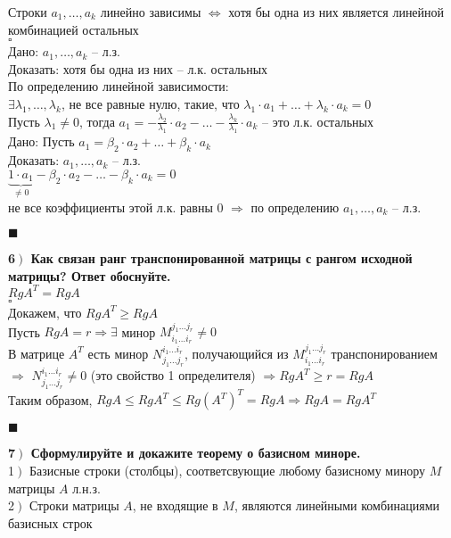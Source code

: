 \documentclass[a4paper,12pt]{article}
\begin{document}
Строки $a_1, \ldots, a_k$ линейно зависимы $\Leftrightarrow$ хотя бы одна из них является линейной комбинацией остальных\\
$\square$\\
Дано: $a_1, \ldots, a_k$ -- л.з.\\
Доказать: хотя бы одна из них -- л.к. остальных\\
По определению линейной зависимости:\\
$\exists \lambda_1, \ldots, \lambda_k$, не все равные нулю, такие, что $\lambda_1\cdot a_1+\ldots+\lambda_k\cdot a_k=0$\\
Пусть $\lambda_1\ne0$, тогда $a_1=-\frac{\lambda_2}{\lambda_1}\cdot a_2-\ldots-\frac{\lambda_k}{\lambda_1}\cdot a_k$ -- это л.к. остальных\\
Дано: Пусть $a_1=\beta_2\cdot a_2+\ldots+\beta_k\cdot a_k$\\
Доказать: $a_1, \ldots,  a_k$ -- л.з.\\
$\underbrace{1\cdot a_1}_{\ne0}-\beta_2\cdot a_2-\ldots-\beta_k\cdot a_k=0$\\
не все коэффициенты этой л.к. равны 0 $\Rightarrow$ по определению $a_1, \ldots, a_k$ -- л.з.
\begin{flushright}
	$\blacksquare$
\end{flushright}
\textbf{6$\left.\right)$ Как связан ранг транспонированной матрицы с рангом исходной матрицы? Ответ обоснуйте.}\\ $RgA^T=RgA$\\
$\square$\\
Докажем, что $RgA^T\geq RgA$\\
Пусть $RgA=r\Rightarrow\exists$ минор $M_{i_1\ldots i_r}^{j_1\ldots j_r}\ne 0$\\
В матрице $A^T$ есть минор $N_{j_1\ldots j_r}^{i_1\ldots i_r}$, получающийся из $M_{i_1\ldots i_r}^{j_1\ldots j_r}$ транспонированием $\Rightarrow$ $N_{j_1\ldots j_r}^{i_1\ldots i_r}\ne0$ (это свойство 1 определителя) $\Rightarrow RgA^T\geq r=RgA$\\
Таким образом, $RgA\leq RgA^T\leq Rg(A^T)^T=RgA \Rightarrow RgA=RgA^T$
\begin{flushright}
	$\blacksquare$
\end{flushright}
\textbf{7$\left.\right)$ Сформулируйте и докажите теорему о базисном миноре.}\\
1$\left.\right)$ Базисные строки (столбцы), соответсвующие любому базисному минору $M$ матрицы $A$ л.н.з.\\
2$\left.\right)$ Строки матрицы $A$, не входящие в $M$, являются линейными комбинациями базисных строк\\
\end{document}
